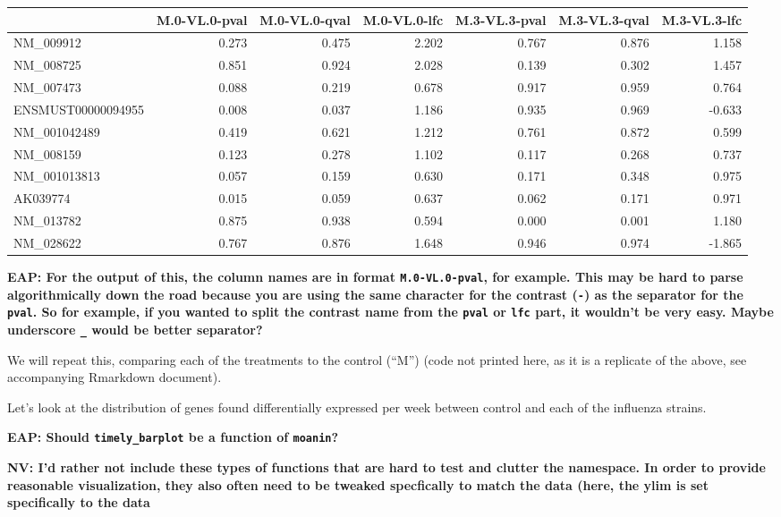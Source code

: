 \documentclass[9pt,a4paper,]{extarticle}
\begin{document}
\begin{tabular}{l|r|r|r|r|r|r}
\hline
  & M.0-VL.0-pval & M.0-VL.0-qval & M.0-VL.0-lfc & M.3-VL.3-pval & M.3-VL.3-qval & M.3-VL.3-lfc\\
\hline
NM\_009912 & 0.273 & 0.475 & 2.202 & 0.767 & 0.876 & 1.158\\
\hline
NM\_008725 & 0.851 & 0.924 & 2.028 & 0.139 & 0.302 & 1.457\\
\hline
NM\_007473 & 0.088 & 0.219 & 0.678 & 0.917 & 0.959 & 0.764\\
\hline
ENSMUST00000094955 & 0.008 & 0.037 & 1.186 & 0.935 & 0.969 & -0.633\\
\hline
NM\_001042489 & 0.419 & 0.621 & 1.212 & 0.761 & 0.872 & 0.599\\
\hline
NM\_008159 & 0.123 & 0.278 & 1.102 & 0.117 & 0.268 & 0.737\\
\hline
NM\_001013813 & 0.057 & 0.159 & 0.630 & 0.171 & 0.348 & 0.975\\
\hline
AK039774 & 0.015 & 0.059 & 0.637 & 0.062 & 0.171 & 0.971\\
\hline
NM\_013782 & 0.875 & 0.938 & 0.594 & 0.000 & 0.001 & 1.180\\
\hline
NM\_028622 & 0.767 & 0.876 & 1.648 & 0.946 & 0.974 & -1.865\\
\hline
\end{tabular}

\textbf{EAP: For the output of this, the column names are in format \texttt{M.0-VL.0-pval}, for example. This may be hard to parse algorithmically down the road because you are using the same character for the contrast (\texttt{-}) as the separator for the \texttt{pval}. So for example, if you wanted to split the contrast name from the \texttt{pval} or \texttt{lfc} part, it wouldn't be very easy. Maybe underscore \texttt{\_} would be better separator?}

We will repeat this, comparing each of the treatments to the control (``M'')
(code not printed here, as it is a replicate of the above, see accompanying
Rmarkdown document).

Let's look at the distribution of genes found differentially expressed per
week between control and each of the influenza strains.

\textbf{EAP: Should \texttt{timely\_barplot} be a function of \texttt{moanin}?}

\textbf{NV: I'd rather not include these types of functions that are hard to test
and clutter the namespace. In order to provide reasonable visualization, they
also often need to be tweaked specfically to match the data (here, the ylim is
set specifically to the data}
\end{document}
